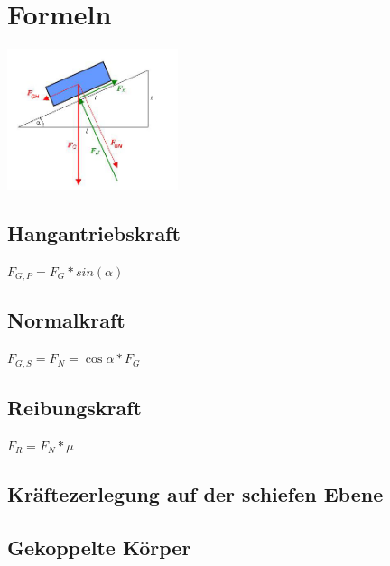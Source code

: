 \documentclass[11pt,twoside,a4paper]{article}
\title{\titleText}
\author{\authorText}
\date{\dateText}
\begin{document}
	\maketitle
	\tableofcontents
	
	\section{Formeln}
	\begin{multicols}{3}
		
		\includegraphics[width=5cm]{se1}
		
		\subsection{Hangantriebskraft}
		\(F_{G,P} = F_G * sin(\alpha)\)
		\subsection{Normalkraft}
		\(F_{G,S} = F_N = \cos\alpha*F_G\)
		\subsection{Reibungskraft}
		\(F_R = F_N * \mu\)
		\subsection{Kräftezerlegung auf der schiefen Ebene}
		\subsection{Gekoppelte Körper}
	\end{multicols}
	
\end{document}
